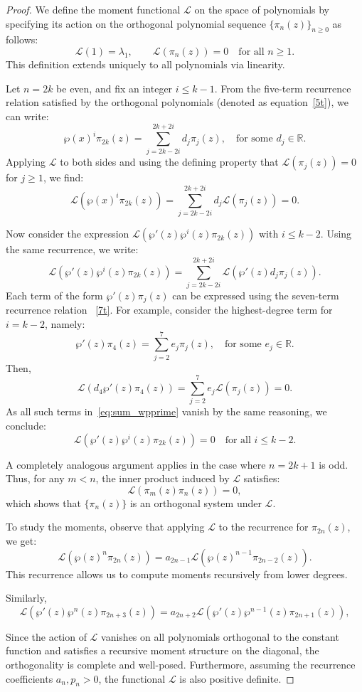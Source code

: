 \documentclass[10pt,a4paper]{amsart}
\begin{document}
\begin{proof}
We define the moment functional \( \mathcal{L} \) on the space of polynomials by specifying its action on the orthogonal polynomial sequence \( \{\pi_n(z)\}_{n \geq 0} \) as follows:
\[
\mathcal{L}(1) = \lambda_1, \qquad \mathcal{L}(\pi_n(z)) = 0 \quad \text{for all } n \geq 1.
\]
This definition extends uniquely to all polynomials via linearity.

Let \( n = 2k \) be even, and fix an integer \( i \leq k - 1 \). From the five-term recurrence relation satisfied by the orthogonal polynomials (denoted as equation~\eqref{5t}), we can write:
\[
\wp(x)^i \pi_{2k}(z) = \sum_{j = 2k - 2i}^{2k + 2i} d_j \pi_j(z), \quad \text{for some } d_j \in \mathbb{R}.
\]
Applying \( \mathcal{L} \) to both sides and using the defining property that \( \mathcal{L}(\pi_j(z)) = 0 \) for \( j \geq 1 \), we find:
\[
\mathcal{L}(\wp(x)^i \pi_{2k}(z)) = \sum_{j = 2k - 2i}^{2k + 2i} d_j \mathcal{L}(\pi_j(z)) = 0.
\]

Now consider the expression \( \mathcal{L}(\wp'(z) \wp^i(z) \pi_{2k}(z)) \) with $i\leq k-2$. Using the same recurrence, we write:
\begin{equation}\label{eq:sum_wpprime}
\mathcal{L}(\wp'(z) \wp^i(z) \pi_{2k}(z)) = \sum_{j = 2k - 2i}^{2k + 2i} \mathcal{L}(\wp'(z) d_j \pi_j(z)).
\end{equation}
Each term of the form \( \wp'(z) \pi_j(z) \) can be expressed using the seven-term recurrence relation ~\eqref{7t}. For example, consider the highest-degree term for \( i = k - 2 \), namely:
\[
\wp'(z) \pi_4(z) = \sum_{j = 2}^{7} e_j \pi_j(z), \quad \text{for some } e_j \in \mathbb{R}.
\]
Then,
\[
\mathcal{L}(d_4 \wp'(z) \pi_4(z)) = \sum_{j = 2}^{7} e_j \mathcal{L}(\pi_j(z)) = 0.
\]
As all such terms in~\eqref{eq:sum_wpprime} vanish by the same reasoning, we conclude:
\[
\mathcal{L}(\wp'(z) \wp^i(z) \pi_{2k}(z)) = 0 \quad \text{for all } i \leq k - 2.
\]

A completely analogous argument applies in the case where \( n = 2k + 1 \) is odd. Thus, for any \( m < n \), the inner product induced by \( \mathcal{L} \) satisfies:
\[
\mathcal{L}(\pi_m(z) \pi_n(z)) = 0,
\]
which shows that \( \{\pi_n(z)\} \) is an orthogonal system under \( \mathcal{L} \).

To study the moments, observe that applying \( \mathcal{L} \) to the recurrence for \( \pi_{2n}(z) \), we get:
\[
\mathcal{L}(\wp(z)^n \pi_{2n}(z)) = a_{2n-1} \mathcal{L}(\wp(z)^{n-1} \pi_{2n-2}(z)).
\]
This recurrence allows us to compute moments recursively from lower degrees.

Similarly,
\[
\mathcal{L}(\wp'(z) \wp^n(z) \pi_{2n+3}(z)) = a_{2n+2} \mathcal{L}(\wp'(z) \wp^{n-1}(z) \pi_{2n+1}(z)),
\]


Since the action of \( \mathcal{L} \) vanishes on all polynomials orthogonal to the constant function and satisfies a recursive moment structure on the diagonal, the orthogonality is complete and well-posed. Furthermore, assuming the recurrence coefficients \( a_n, p_n > 0 \), the functional \( \mathcal{L} \) is also positive definite.
\end{proof}
\end{document}

